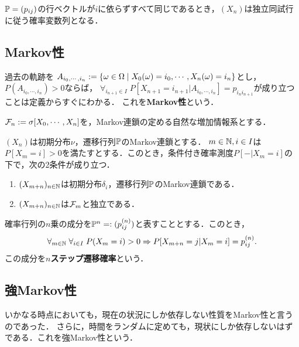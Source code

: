 \documentclass[uplatex,dvipdfmx]{jsreport}
\begin{document}
\begin{example}[i.i.d.はMarkov過程]
    $\mathbb{P}=(p_{ij})$の行ベクトルが$i$に依らずすべて同じであるとき，$(X_n)$は独立同試行に従う確率変数列となる．
\end{example}

\subsection{Markov性}

\begin{definition}
    過去の軌跡を
    $A_{i_0,\cdots,i_n}:=\left\{\omega\in\Omega\mid X_0(\omega)=i_0,\cdots,X_n(\omega)=i_n\right\}$とし，$P(A_{i_0,\cdots,i_n})>0$ならば，
    $\forall_{i_{n+1}\in I}\;P[X_{n+1}=i_{n+1}|A_{i_0,\cdots,i_n}]=p_{i_ni_{n+1}}$が成り立つことは定義からすぐにわかる．
    これを\textbf{Markov性}という．
\end{definition}

\begin{notation}
    $\mathcal{F}_n:=\sigma[X_0,\cdots,X_n]$を，Markov連鎖の定める自然な増加情報系とする．
\end{notation}

\begin{theorem}
    $(X_n)$は初期分布$\nu$，遷移行列$\mathbb{P}$のMarkov連鎖とする．
    $m\in\mathbb{N},i\in I$は$P[X_m=i]>0$を満たすとする．このとき，条件付き確率測度$P[-|X_m=i]$の下で，次の2条件が成り立つ．
    \begin{enumerate}
        \item $(X_{m+n})_{n\in\mathbb{N}}$は初期分布$\delta_i$，遷移行列$\mathbb{P}$のMarkov連鎖である．
        \item $(X_{m+n})_{n\in\mathbb{N}}$は$\mathcal{F}_m$と独立である．
    \end{enumerate}
\end{theorem}

\begin{lemma}
    確率行列の$n$乗の成分を$\mathbb{P}^n=:(p_{ij}^{(n)})$と表すこととする．このとき，
    \[\forall_{m\in\mathbb{N}}\;\forall_{i\in I}\;P(X_m=i)>0\Rightarrow P[X_{m+n}=j|X_m=i]=p^{(n)}_{ij}.\]
    この成分を\textbf{$n$ステップ遷移確率}という．
\end{lemma}

\subsection{強Markov性}

\begin{tcolorbox}[colframe=ForestGreen, colback=ForestGreen!10!white,breakable,colbacktitle=ForestGreen!40!white,coltitle=black,fonttitle=\bfseries\sffamily,
title=]
    いかなる時点においても，現在の状況にしか依存しない性質をMarkov性と言うのであった．
    さらに，時間をランダムに定めても，現状にしか依存しないはずである．これを強Markov性という．
\end{tcolorbox}
\end{document}
